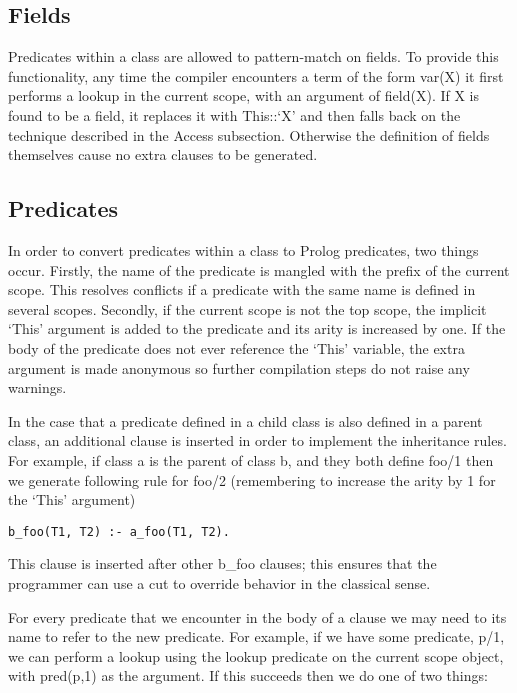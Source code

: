\documentclass[12pt,a4paper,twoside,openright]{report}
\begin{document}
\subsection{Fields}

Predicates within a class are allowed to pattern-match on fields. To provide this functionality, any time the compiler encounters a term of the form var(X) it first performs a lookup in the current scope, with an argument of field(X). If X is found to be a field, it replaces it with This::`X' and then falls back on the technique described in the Access subsection. Otherwise the definition of fields themselves cause no extra clauses to be generated.  

\subsection{Predicates}

In order to convert predicates within a class to Prolog predicates, two things occur. Firstly, the name of the predicate is mangled with the prefix of the current scope. This resolves conflicts if a predicate with the same name is defined in several scopes. Secondly, if the current scope is not the top scope, the implicit `This' argument is added to the predicate and its arity is increased by one. If the body of the predicate does not ever reference the `This' variable, the extra argument is made anonymous so further compilation steps do not raise any warnings.

\bigskip

In the case that a predicate defined in a child class is also defined in a parent class, an additional clause is inserted in order to implement the inheritance rules. For example, if class a is the parent of class b, and they both define foo/1 then we generate following rule for foo/2 (remembering to increase the arity by 1 for the `This' argument)

\begin{lstlisting}
b_foo(T1, T2) :- a_foo(T1, T2).
\end{lstlisting}

\noindent This clause is inserted after other b_foo clauses; this ensures that the programmer can use a cut to override behavior in the classical sense.

\bigskip

For every predicate that we encounter in the body of a clause we may need to its name to refer to the new predicate. For example, if we have some predicate, p/1, we can perform a lookup using the lookup predicate on the current scope object, with pred(p,1) as the argument. If this succeeds then we do one of two things:
\end{document}

